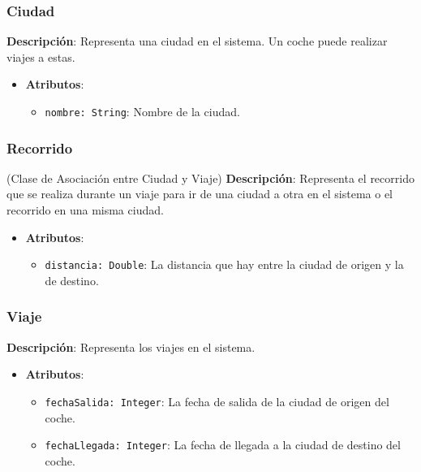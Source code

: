 \documentclass[12pt.a4paper]{article}
\begin{document}
\subsubsection{Ciudad}
\textbf{Descripción}: Representa una ciudad en el sistema. Un coche puede realizar viajes a estas.

\begin{itemize}
    \item \textbf{Atributos}:
    \begin{itemize}
        \item \texttt{nombre: String}: Nombre de la ciudad.
    \end{itemize}
\end{itemize}

\subsubsection{Recorrido} (Clase de Asociación entre Ciudad y Viaje)
\textbf{Descripción}: Representa el recorrido que se realiza durante un viaje para ir de una ciudad a otra en el sistema o el recorrido en una misma ciudad.

\begin{itemize}
    \item \textbf{Atributos}:
    \begin{itemize}
        \item \texttt{distancia: Double}: La distancia que hay entre la ciudad de origen y la de destino.
    \end{itemize}
\end{itemize}

\subsubsection{Viaje}
\textbf{Descripción}:  Representa los viajes en el sistema. 

\begin{itemize}
    \item \textbf{Atributos}:
    \begin{itemize}
        \item \texttt{fechaSalida: Integer}: La fecha de salida de la ciudad de origen del coche.
        \item \texttt{fechaLlegada: Integer}: La fecha de llegada a la ciudad de destino del coche.
    \end{itemize}
\end{itemize}

\newpage
\end{document}
